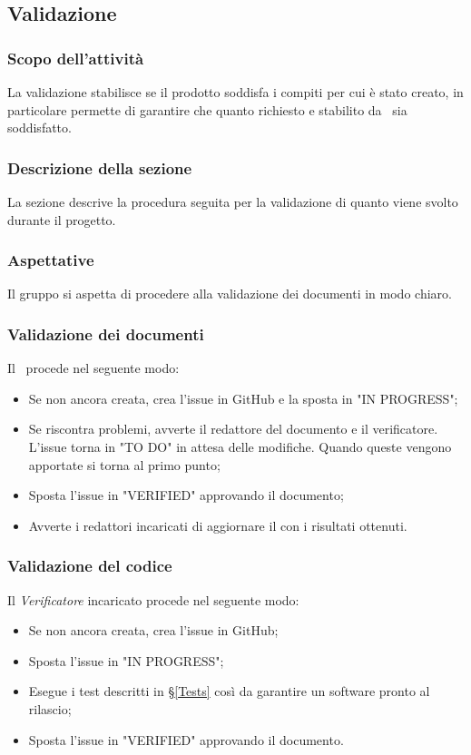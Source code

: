 \subsection{Validazione}\label{PSup_Validazione}
\subsubsection{Scopo dell'attività}\label{PSup_Validazione_Scopo}
La validazione stabilisce se il prodotto soddisfa i compiti per cui è stato creato, in particolare permette di garantire che quanto richiesto e stabilito da \Proponente\ sia soddisfatto.

\subsubsection{Descrizione della sezione} 
La sezione descrive la procedura seguita per la validazione di quanto viene svolto durante il progetto.

\subsubsection{Aspettative}
Il gruppo si aspetta di procedere alla validazione dei documenti in modo chiaro. 

\subsubsection{Validazione dei documenti}\label{ValidazioneDoc}
Il \Responsabile\ procede nel seguente modo:
\begin{itemize}
	\item Se non ancora creata, crea l'issue in GitHub e la sposta in "IN PROGRESS";
	\item Se riscontra problemi, avverte il redattore del documento e il verificatore. L'issue torna in "TO DO" in attesa delle modifiche. Quando queste vengono apportate si torna al primo punto;
	\item Sposta l'issue in "VERIFIED" approvando il documento;
	\item Avverte i redattori incaricati di aggiornare il \PdQv{} con i risultati ottenuti.
\end{itemize}

\subsubsection{Validazione del codice}\label{ValidazioneCodice}
Il \textit{Verificatore} incaricato procede nel seguente modo:
\begin{itemize}
	\item Se non ancora creata, crea l'issue in GitHub;
	\item Sposta l'issue in "IN PROGRESS";
	\item Esegue i test descritti in \S\ref{Tests} così da garantire un software pronto al rilascio;
	\item Sposta l'issue in "VERIFIED" approvando il documento.
\end{itemize}

